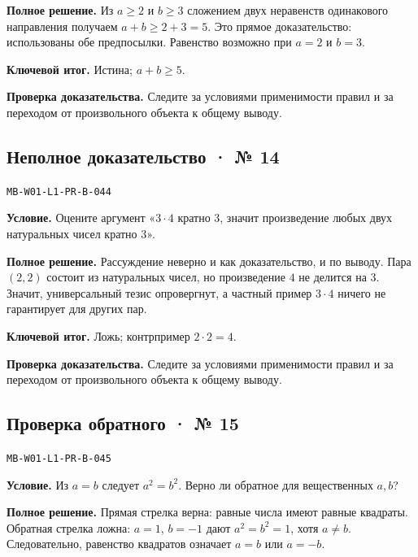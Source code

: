 \documentclass[11pt,a4paper,openany]{book}
\newcommand{\muid}[1]{\texttt{\footnotesize #1}}
\begin{document}
\textbf{Полное решение.} Из $a\ge2$ и $b\ge3$ сложением двух неравенств одинакового направления получаем $a+b\ge2+3=5$. Это прямое доказательство: использованы обе предпосылки. Равенство возможно при $a=2$ и $b=3$.


\begin{learnbox}\textbf{Ключевой итог.} Истина; $a+b\ge5$.\par \textbf{Проверка доказательства.} 
Следите за условиями применимости правил и за переходом от произвольного объекта к общему выводу. 
\end{learnbox}

\subsection*{Неполное доказательство · № 14}\hypertarget{solution:MB-W01-L1-PR-B-044}{}

\muid{MB-W01-L1-PR-B-044}\par

\textbf{Условие.} Оцените аргумент «$3\cdot4$ кратно $3$, значит произведение любых двух натуральных чисел кратно $3$».\par

\textbf{Полное решение.} Рассуждение неверно и как доказательство, и по выводу. Пара $(2,2)$ состоит из натуральных чисел, но произведение $4$ не делится на $3$. Значит, универсальный тезис опровергнут, а частный пример $3\cdot4$ ничего не гарантирует для других пар.


\begin{learnbox}\textbf{Ключевой итог.} Ложь; контрпример $2\cdot2=4$.\par \textbf{Проверка доказательства.} 
Следите за условиями применимости правил и за переходом от произвольного объекта к общему выводу. 
\end{learnbox}

\subsection*{Проверка обратного · № 15}\hypertarget{solution:MB-W01-L1-PR-B-045}{}

\muid{MB-W01-L1-PR-B-045}\par

\textbf{Условие.} Из $a=b$ следует $a^2=b^2$. Верно ли обратное для вещественных $a,b$?\par

\textbf{Полное решение.} Прямая стрелка верна: равные числа имеют равные квадраты. Обратная стрелка ложна: $a=1$, $b=-1$ дают $a^2=b^2=1$, хотя $a\ne b$. Следовательно, равенство квадратов означает $a=b$ или $a=-b$.
\end{document}
